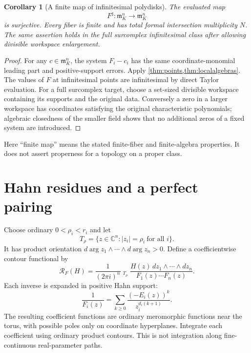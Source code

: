 \documentclass[11pt,letterpaper]{article}
\newtheorem{corollary}[theorem]{Corollary}
\theoremstyle{definition}
\theoremstyle{remark}
\newcommand{\C}{\mathbb C}
\newcommand{\mm}{\mathfrak m}
\newcommand{\RR}{\mathscr R}
\newcommand{\sh}{^{\sharp}}
\newcommand{\HInt}{\mathop{\int^{\!H}}\nolimits}
\newcommand{\dz}{\,dz_1\wedge\cdots\wedge dz_n}
\numberwithin{equation}{section}
\begin{document}
\begin{corollary}[A finite map of infinitesimal polydisks]\label{cor:finitemap}
The evaluated map
\[
 F\sh:\mm_K^n\longrightarrow\mm_K^n
\]
is surjective. Every fiber is finite and has total formal intersection multiplicity $N$. The same assertion holds in the full surcomplex infinitesimal class after allowing divisible workspace enlargement.
\end{corollary}
\begin{proof}
For any $c\in\mm_K^n$, the system $F_i-c_i$ has the same coordinate-monomial leading part and positive-support errors. Apply \cref{thm:points,thm:localalgebras}. The values of $F$ at infinitesimal points are infinitesimal by direct Taylor evaluation. For a full surcomplex target, choose a set-sized divisible workspace containing its supports and the original data. Conversely a zero in a larger workspace has coordinates satisfying the original characteristic polynomials; algebraic closedness of the smaller field shows that no additional zeros of a fixed system are introduced.
\end{proof}

Here ``finite map'' means the stated finite-fiber and finite-algebra properties. It does not assert properness for a topology on a proper class.

\section{Hahn residues and a perfect pairing}\label{sec:residues}
Choose ordinary $0<\rho_i<r_i$ and let
\[
 T_\rho=\{z\in\C^n:|z_i|=\rho_i\ \text{for all }i\}.
\]
It has product orientation $d\arg z_1\wedge\cdots\wedge d\arg z_n>0$. Define a coefficientwise contour functional by
\begin{equation}\label{eq:resdefinition}
 \RR_F(H)=\frac{1}{(2\pi i)^n}
 \HInt_{T_\rho}\frac{H(z)\dz}{F_1(z)\cdots F_n(z)}.
\end{equation}
Each inverse is expanded in positive Hahn support:
\begin{equation}\label{eq:denexpansion}
 \frac1{F_i(z)}=\sum_{k\ge0}\frac{(-E_i(z))^k}{z_i^{d_i(k+1)}}.
\end{equation}
The resulting coefficient functions are ordinary meromorphic functions near the torus, with possible poles only on coordinate hyperplanes. Integrate each coefficient using ordinary product contours. This is not integration along fine-continuous real-parameter paths.
\end{document}
